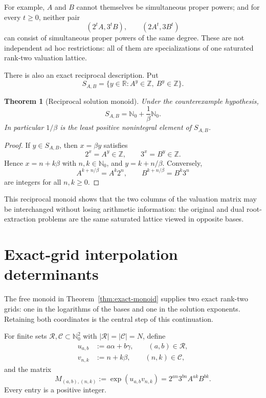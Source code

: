 \documentclass[11pt]{article}
\newtheorem{theorem}{Theorem}[section]
\theoremstyle{definition}
\newcommand{\Nzero}{\mathbb N_0}
\begin{document}
For example, $A$ and $B$ cannot themselves be simultaneous proper powers; and
for every $t\ge0$, neither pair
\[
  (2^tA,3^tB),\qquad (2A^t,3B^t)
\]
can consist of simultaneous proper powers of the same degree.  These are not
independent ad hoc restrictions: all of them are specializations of one
saturated rank-two valuation lattice.

There is also an exact reciprocal description.  Put
\[
 S_{A,B}=\{y\in\mathbb R:A^y\in\mathbb Z,
                              \ B^y\in\mathbb Z\}.
\]

\begin{theorem}[Reciprocal solution monoid]
\label{thm:reciprocal-monoid}
Under the counterexample hypothesis,
\[
  S_{A,B}=\mathbb N_0+\frac1\beta\mathbb N_0.
\]
In particular $1/\beta$ is the least positive nonintegral element of
$S_{A,B}$.
\end{theorem}

\begin{proof}
If $y\in S_{A,B}$, then $x=\beta y$ satisfies
\[
  2^x=A^y\in\mathbb Z,
  \qquad
  3^x=B^y\in\mathbb Z.
\]
Hence $x=n+k\beta$ with $n,k\in\mathbb N_0$, and
$y=k+n/\beta$.  Conversely,
\[
 A^{k+n/\beta}=A^k2^n,
 \qquad
 B^{k+n/\beta}=B^k3^n
\]
are integers for all $n,k\ge0$.
\end{proof}

This reciprocal monoid shows that the two columns of the valuation matrix may
be interchanged without losing arithmetic information: the original and dual
root-extraction problems are the same saturated lattice viewed in opposite
bases.


\section{Exact-grid interpolation determinants}

The free monoid in Theorem~\ref{thm:exact-monoid} supplies two exact
rank-two grids: one in the logarithms of the bases and one in the solution
exponents.  Retaining both coordinates is the central step of this
continuation.

For finite sets $\mathcal R,\mathcal C\subset\Nzero^2$ with
$|\mathcal R|=|\mathcal C|=N$, define
\begin{align*}
 u_{a,b}&:=a\alpha+b\gamma,\qquad (a,b)\in\mathcal R,\\
 v_{n,k}&:=n+k\beta,\qquad (n,k)\in\mathcal C,
\end{align*}
and the matrix
\begin{equation}\label{eq:grid-matrix}
 M_{(a,b),(n,k)}
 :=\exp(u_{a,b}v_{n,k})
 =2^{an}3^{bn}A^{ak}B^{bk}.
\end{equation}
Every entry is a positive integer.
\end{document}
